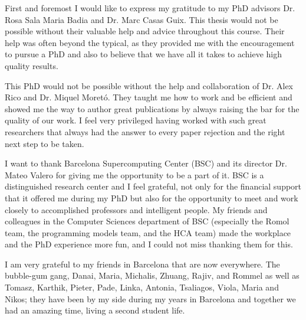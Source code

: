 





\begin{acknowledgements}

First and foremost I would like to express my gratitude to my PhD advisors Dr. Rosa Sala Maria Badia and Dr. Marc Casas Guix. 
This thesis would not be possible without their valuable help and advice throughout this course. 
Their help was often beyond the typical, as they provided me with the encouragement to pursue a PhD and also to believe that we have all it takes to achieve high quality results.

This PhD would not be possible without the help and collaboration of Dr. Alex Rico and Dr. Miquel Moret{\'o}. 
They taught me how to work and be efficient and showed me the way to author great publications by always raising the bar for the quality of our work.
I feel very privileged having worked with such great researchers that always had the answer to every paper rejection and the right next step to be taken.

I want to thank Barcelona Supercomputing Center (BSC) and its director Dr. Mateo Valero for giving me the opportunity to be a part of it.
BSC is a distinguished research center and I feel grateful, not only for the financial support that it offered me during my PhD but also for the opportunity to meet and work closely to accomplished professors and intelligent people.
My friends and colleagues in the Computer Sciences department of BSC (especially the Romol team, the programming models team, and the HCA team) made the workplace and the PhD experience more fun, and I could not miss thanking them for this.

I am very grateful to my friends in Barcelona that are now everywhere.
The bubble-gum gang, Danai, Maria, Michalis, Zhuang, Rajiv, and Rommel as well as Tomasz, Karthik, Pieter, Pade, Linka, Antonia, Tsaliagos, Viola, Maria and Nikos;
they have been by my side during my years in Barcelona and together we had an amazing time, living a second student life.


\end{acknowledgements}
